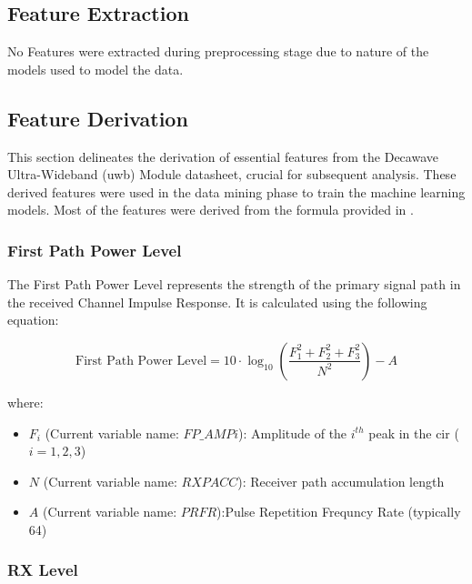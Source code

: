 \subsection{Feature Extraction}\label{feature_extraction}

No Features were extracted during preprocessing stage due to nature of the models used to model the data.


\subsection{Feature Derivation}\label{feature_derivation}

This section delineates the derivation of essential features from the Decawave Ultra-Wideband (\acrshort{uwb}) Module datasheet, crucial for subsequent analysis. These derived features were used in the data mining phase to train the machine learning models. Most of the features were derived from the formula provided in \cite{DecawaveDW1000}.

\subsubsection{First Path Power Level}\label{first_path_power_level}

The First Path Power Level represents the strength of the primary signal path in the received Channel Impulse Response. It is calculated using the following equation:

\begin{equation}
  \text{First Path Power Level} = 10 \cdot \log_{10} \left( \frac{F_1^2 + F_2^2 + F_3^2}{N^2} \right) - A
\end{equation}

where:

\begin{itemize}
  \item $F_i$ (Current variable name: $FP\_AMPi$): Amplitude of the $i^{th}$ peak in the \acrshort{cir} ($i = 1, 2, 3$)
  \item $N$ (Current variable name: $RXPACC$): Receiver path accumulation length
  \item $A$ (Current variable name: $PRFR$):Pulse Repetition Frequncy Rate (typically 64)
\end{itemize}

\subsubsection{RX Level}\label{rx_level}

